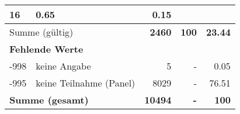 \begin{longtable}{lXrrr}
       \num{16} &
       \num[round-mode=places,round-precision=2]{0.65} &
         \num[round-mode=places,round-precision=2]{0.15} \\
     \midrule
     \multicolumn{2}{l}{Summe (gültig)} &
       \textbf{\num{2460}} &
     \textbf{\num{100}} &
       \textbf{\num[round-mode=places,round-precision=2]{23.44}} \\
     \multicolumn{5}{l}{\textbf{Fehlende Werte}}\\
       -998 &
       keine Angabe &
         \num{5} &
        - &
         \num[round-mode=places,round-precision=2]{0.05} \\
       -995 &
       keine Teilnahme (Panel) &
         \num{8029} &
        - &
         \num[round-mode=places,round-precision=2]{76.51} \\
     \midrule
     \multicolumn{2}{l}{\textbf{Summe (gesamt)}} &
          \textbf{\num{10494}} &
        \textbf{-} &
        \textbf{\num{100}} \\
     \bottomrule
     \end{longtable}
     
